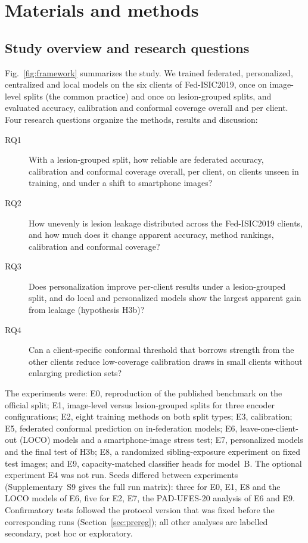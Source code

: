 \section{Materials and methods}
\label{sec:methods}

\subsection{Study overview and research questions}
\label{sec:overview}

Fig.~\ref{fig:framework} summarizes the study. We trained federated, personalized, centralized and
local models on the six clients of Fed-ISIC2019, once on image-level splits (the common practice) and
once on lesion-grouped splits, and evaluated accuracy, calibration and conformal coverage overall and per
client. Four research questions organize the methods, results and discussion:

\begin{description}
\item[RQ1] With a lesion-grouped split, how reliable are federated accuracy, calibration and conformal
  coverage overall, per client, on clients unseen in training, and under a shift to smartphone images?
\item[RQ2] How unevenly is lesion leakage distributed across the Fed-ISIC2019 clients, and how much does
  it change apparent accuracy, method rankings, calibration and conformal coverage?
\item[RQ3] Does personalization improve per-client results under a lesion-grouped split, and do local
  and personalized models show the largest apparent gain from leakage (hypothesis H3b)?
\item[RQ4] Can a client-specific conformal threshold that borrows strength from the other clients
  reduce low-coverage calibration draws in small clients without enlarging prediction sets?
\end{description}

The experiments were: E0, reproduction of the published benchmark on the official split; E1,
image-level versus lesion-grouped splits for three encoder configurations; E2, eight training methods on
both split types; E3, calibration; E5, federated conformal prediction on in-federation models; E6,
leave-one-client-out (LOCO) models and a smartphone-image stress test; E7, personalized models and the
final test of H3b; E8, a randomized sibling-exposure experiment on fixed test images; and E9,
capacity-matched classifier heads for model~B. The optional experiment E4 was not run. Seeds differed
between experiments (Supplementary~S9 gives the full run matrix): three for E0, E1, E8 and the LOCO models of E6, five for E2, E7, the PAD-UFES-20 analysis of E6
and E9. Confirmatory tests followed the protocol version that was fixed before the corresponding runs
(Section~\ref{sec:prereg}); all other analyses are labelled secondary, post hoc or exploratory.

